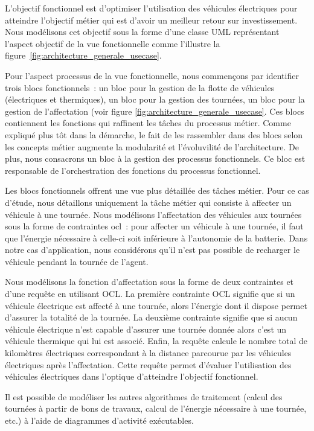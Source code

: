 L'objectif fonctionnel est d'optimiser
l'utilisation des véhicules électriques pour atteindre l'objectif métier qui est
d'avoir un meilleur retour sur investissement. Nous modélisons cet objectif 
sous la forme d'une classe UML
représentant l'aspect objectif de la vue fonctionnelle comme l'illustre la 
figure~\ref{fig:architecture_generale_usecase}.

Pour l'aspect processus de la vue fonctionnelle, nous commençons par identifier trois blocs fonctionnels~:
un bloc pour la gestion de la flotte de véhicules (électriques et thermiques),
un bloc pour la gestion des tournées, un bloc pour la gestion de l'affectation
(voir figure \ref{fig:architecture_generale_usecase}. Ces blocs contiennent les
fonctions qui raffinent les tâches du processus métier. Comme expliqué plus tôt
dans la démarche, le fait de les rassembler dans des blocs selon les concepts
métier augmente la modularité et l'évoluvilité de l'architecture. De plus, nous
consacrons un bloc à la gestion des processus fonctionnels. Ce bloc est
responsable de l'orchestration des fonctions du processus fonctionnel.

Les blocs fonctionnels offrent une vue plus détaillée des tâches métier. 
Pour ce cas d'étude, nous détaillons uniquement la tâche métier qui consiste à
affecter un véhicule à une tournée. Nous modélisons l'affectation des véhicules 
aux tournées
sous la forme de contraintes \gls{ocl}~: pour affecter un véhicule à une tournée, il
faut que l'énergie nécessaire à celle-ci soit inférieure à l'autonomie de la
batterie. Dans notre cas d'application, nous considérons qu'il n'est pas
possible de recharger le véhicule pendant la tournée de l'agent.

Nous modélisons la fonction d'affectation sous la
forme de deux contraintes et d'une requête en utilisant OCL. La première contrainte OCL signifie
que si un véhicule électrique est affecté à une tournée, alors l'énergie dont il
dispose permet d'assurer la totalité de la tournée. La deuxième contrainte
signifie que si aucun véhicule électrique n'est capable d'assurer une tournée
donnée alors c'est un véhicule thermique qui lui est associé. Enfin, la requête
calcule le nombre total de kilomètres électriques correspondant à la distance
parcourue par les véhicules électriques après l'affectation. Cette requête permet
d'évaluer l'utilisation  des véhicules électriques dans l'optique d'atteindre
l'objectif fonctionnel.

Il est possible de modéliser les autres algorithmes de
traitement (calcul des tournées à partir de bons de travaux, calcul de l'énergie
nécessaire à une tournée, etc.) à l'aide de diagrammes d'activité exécutables.



